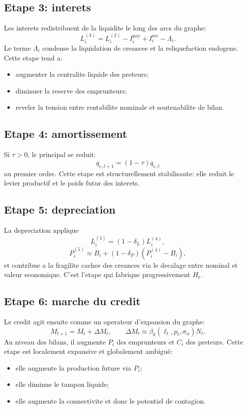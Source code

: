 \documentclass[11pt,a4paper]{article}
\begin{document}
\subsection{Etape 3: interets}
Les interets redistribuent de la liquidite le long des arcs du graphe:
\[
L_i^{(3)} = L_i^{(2)} - I_i^{\mathrm{pay}} + I_i^{\mathrm{rec}} - \Lambda_i.
\]
Le terme $\Lambda_i$ condense la liquidation de creances et la reliquefaction endogene. Cette etape tend a:
\begin{itemize}
\item augmenter la centralite liquide des preteurs;
\item diminuer la reserve des emprunteurs;
\item reveler la tension entre rentabilite nominale et soutenabilite de bilan.
\end{itemize}

\subsection{Etape 4: amortissement}
Si $\tau>0$, le principal se reduit:
\[
q_{e,t+1}=(1-\tau)q_{e,t}
\]
au premier ordre. Cette etape est structurellement stabilisante: elle reduit le levier productif et le poids futur des interets.

\subsection{Etape 5: depreciation}
La depreciation applique
\[
L_i^{(5)}=(1-\delta_L)L_i^{(4)},
\]
\[
P_i^{(5)} \approx B_i + (1-\delta_P)(P_i^{(4)}-B_i),
\]
et contribue a la fragilite cachee des creances via le decalage entre nominal et valeur economique. C'est l'etape qui fabrique progressivement $H_t$.

\subsection{Etape 6: marche du credit}
Le credit agit ensuite comme un operateur d'expansion du graphe:
\[
M_{t+1} = M_t + \Delta M_t,
\qquad
\Delta M_t \approx \beta_k(\ell_t,p_t,\sigma_\alpha)N_t.
\]
Au niveau des bilans, il augmente $P_i$ des emprunteurs et $C_i$ des preteurs. Cette etape est localement expansive et globalement ambiguë:
\begin{itemize}
\item elle augmente la production future via $P_i$;
\item elle diminue le tampon liquide;
\item elle augmente la connectivite et donc le potentiel de contagion.
\end{itemize}
\end{document}
